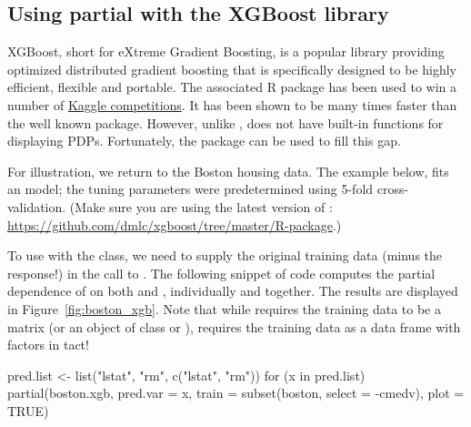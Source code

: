 \subsection{Using partial with the XGBoost library}
\label{sec:xgboost}

XGBoost, short for eXtreme Gradient Boosting, is a popular library providing optimized distributed gradient boosting that is specifically designed to be highly efficient, flexible and portable. The associated R package  has been used to win a number of \href{https://www.kaggle.com/}{Kaggle competitions}. It has been shown to be many times faster than the well known  package. However, unlike ,  does not have built-in functions for displaying PDPs. Fortunately, the  package can be used to fill this gap.

For illustration, we return to the Boston housing data. The example below, fits an  model; the tuning parameters were predetermined using 5-fold cross-validation. (Make sure you are using the latest version of : \url{https://github.com/dmlc/xgboost/tree/master/R-package}.)

To use  with the  class, we need to supply the original training data (minus the response!) in the call to . The following snippet of code computes the partial dependence of  on both  and , individually and together. The results are displayed in Figure~\ref{fig:boston_xgb}. Note that while  requires the training data to be a matrix (or an object of class  or ),  requires the training data as a data frame with factors in tact!
\begin{example}
pred.list <- list("lstat", "rm", c("lstat", "rm"))
for (x in pred.list) {
  partial(boston.xgb, pred.var = x, train = subset(boston, select = -cmedv),
          plot = TRUE)
}
\end{example}

